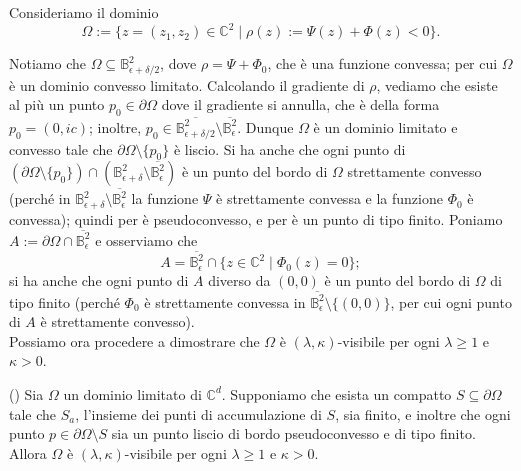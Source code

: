 Consideriamo il dominio
$$\Omega:=\{z=(z_1,z_2)\in\mathbb{C}^2\mid \rho(z):=\Psi(z)+\Phi(z)<0\}.$$

Notiamo che $\Omega\subseteq\mathbb{B}^2_{\epsilon+\delta/2}$, dove $\rho=\Psi+\Phi_0$, che è una funzione convessa; per cui $\Omega$ è un dominio convesso limitato. Calcolando il gradiente di $\rho$, vediamo che esiste al più un punto $p_0\in\partial\Omega$ dove il gradiente si annulla, che è della forma $p_0=(0,ic)$; inoltre, $p_0\in\overline{\mathbb{B}^2_{\epsilon+\delta/2}}\setminus\overline{\mathbb{B}^2_\epsilon}$. Dunque $\Omega$ è un dominio limitato e convesso tale che $\partial\Omega\setminus\{p_0\}$ è liscio. Si ha anche che ogni punto di $(\partial\Omega\setminus\{p_0\})\cap(\mathbb{B}^2_{\epsilon+\delta}\setminus\overline{\mathbb{B}^2_\epsilon})$ è un punto del bordo di $\Omega$ strettamente convesso (perché in $\mathbb{B}^2_{\epsilon+\delta}\setminus\overline{\mathbb{B}^2_\epsilon}$ la funzione $\Psi$ è strettamente convessa e la funzione $\Phi_0$ è convessa); quindi per \cite[Proposition 3.1.9]{Kr} è pseudoconvesso, e per \cite[Corollary 5.6]{D'A} è un punto di tipo finito. Poniamo $A:=\partial\Omega\cap\overline{\mathbb{B}^2_\epsilon}$ e osserviamo che
$$A=\overline{\mathbb{B}^2_\epsilon}\cap\{z\in\mathbb{C}^2\mid \Phi_0(z)=0\};$$
si ha anche che ogni punto di $A$ diverso da $(0,0)$ è un punto del bordo di $\Omega$ di tipo finito (perché $\Phi_0$ è strettamente convessa in $\overline{\mathbb{B}^2_\epsilon}\setminus\{(0,0)\}$, per cui ogni punto di $A$ è strettamente convesso). \\

Possiamo ora procedere a dimostrare che $\Omega$ è $(\lambda,\kappa)$-visibile per ogni $\lambda \ge 1$ e $\kappa>0$.

\begin{prop} \label{safinisvis}
    (\cite[Corollary 1.10]{CMS}) Sia $\Omega$ un dominio limitato di $\mathbb{C}^d$. Supponiamo che esista un compatto $S\subseteq\partial\Omega$ tale che $S_a$, l'insieme dei punti di accumulazione di $S$, sia finito, e inoltre che ogni punto $p\in\partial\Omega\setminus S$ sia un punto liscio di bordo pseudoconvesso e di tipo finito. Allora $\Omega$ è $(\lambda,\kappa)$-visibile per ogni $\lambda \ge 1$ e $\kappa>0$.
\end{prop}

